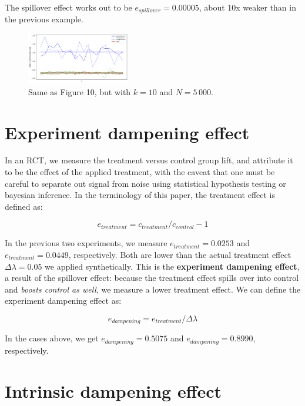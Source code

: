 \documentclass[final,5p,times,twocolumn,authoryear]{elsarticle}
\begin{document}
The spillover effect works out to be $e_{spillover}=0.00005$, about 10x weaker than in the previous example.

\begin{figure}[h]
	\centering 
	\includegraphics[width=0.4\textwidth]{figure-11.png}	
	\caption{Same as Figure 10, but with $k=10$ and $N=5\,000$.} 
\end{figure}

\section{Experiment dampening effect}

In an RCT, we measure the treatment versus control group lift, and attribute it to be the effect of the applied treatment, with the caveat that one must be careful to separate out signal from noise using statistical hypothesis testing or bayesian inference. In the terminology of this paper, the treatment effect is defined as:

\begin{equation}
e_{treatment} = c_{treatment} / c_{control} - 1
\end{equation}

In the previous two experiments, we measure $e_{treatment} = 0.0253$ and $e_{treatment} = 0.0449$, respectively. Both are lower than the actual treatment effect $\Delta \lambda = 0.05$ we applied synthetically. This is the \textbf{experiment dampening effect}, a result of the spillover effect: because the treatment effect spills over into control and \textit{boosts control as well}, we measure a lower treatment effect. We can define the experiment dampening effect as:

\begin{equation}
e_{dampening} = e_{treatment} / \Delta \lambda
\end{equation}

In the cases above, we get $e_{dampening} = 0.5075$ and $e_{dampening} = 0.8990$, respectively.

\section{Intrinsic dampening effect}
\end{document}
